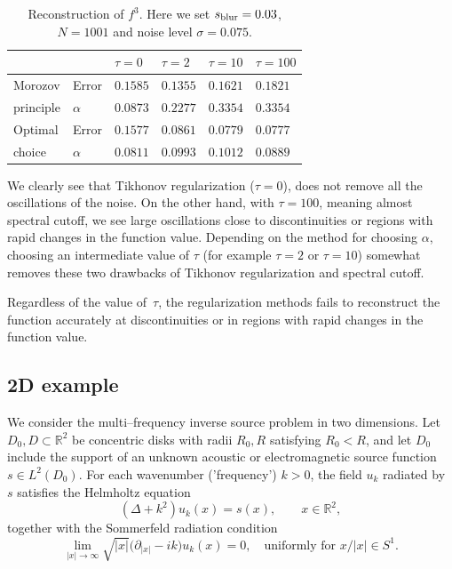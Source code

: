 \documentclass[a4paper]{article}
\begin{document}
\begin{table}[H] 
\centering
\begin{tabular}{llllll}
                             &                              & $\tau = 0$ & $\tau = 2$ & $\tau = 10$ & $\tau = 100$ \\ \hline
\multicolumn{1}{l|}{Morozov} & \multicolumn{1}{l|}{Error}   &           $0.1585$   &   $0.1355$   &   $0.1621$   &   $0.1821$               \\
\multicolumn{1}{l|}{principle}  & \multicolumn{1}{l|}{$\alpha$} &           $0.0873$   &   $0.2277$   &   $0.3354$   &   $0.3354$             \\ \hline
\multicolumn{1}{l|}{Optimal} & \multicolumn{1}{l|}{Error}   &            $0.1577$   &   $0.0861$   &   $0.0779$   &   $0.0777$             \\
\multicolumn{1}{l|}{choice}  & \multicolumn{1}{l|}{$\alpha$} &           $0.0811$   &   $0.0993$   &   $0.1012$   &   $0.0889$             \\ \hline
\end{tabular}
\caption{Reconstruction of $f^3$. Here we set $s_{\rm blur} = 0.03$, $N=1001$ and noise level $\sigma = 0.075$.}\label{tab:3}
\end{table}


We clearly see that Tikhonov regularization ($\tau = 0$),
does not remove all the oscillations of the noise.
On the other hand, with $\tau=100$, meaning almost
spectral cutoff, we see large oscillations close to
discontinuities or regions with rapid changes in the
function value. Depending on the method for
choosing $\alpha$, choosing an intermediate value
of $\tau$ (for example $\tau=2$ or $\tau=10$) somewhat
removes these two drawbacks of Tikhonov regularization
and spectral cutoff.

Regardless of the value of~$\tau$, the regularization
methods fails to reconstruct the function accurately
at discontinuities or in regions with rapid changes
in the function value.

\subsection{2D example}

We consider the multi--frequency inverse source problem in two dimensions.
Let $D_0,D\subset\mathbb{R}^2$ be concentric disks with radii $R_0,R$ satisfying $R_0<R$, and let $D_0$ include the support
of an unknown acoustic or electromagnetic source function $s\in L^2(D_0)$. For each wavenumber ('frequency') $k>0$,
the field $u_k$ radiated by $s$ satisfies the Helmholtz equation
\begin{equation}
(\Delta + k^2)u_k(x)=s(x), \qquad x\in\mathbb{R}^2,
\end{equation}
together with the Sommerfeld radiation condition
\begin{equation}
\lim_{|x|\to\infty}\sqrt{|x|}
\big(\partial_{|x|}-ik\big)u_k(x)=0,
\quad \text{uniformly for } x/|x|\in S^1 .
\end{equation}
\end{document}
